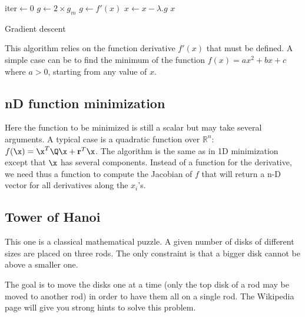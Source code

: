 \documentclass{ecnreport}
\begin{document}
\begin{algorithm}[!h]
{}
iter$\gets$0\;
$g\gets2\times g_m$\;
{
$g\gets f'(x)$\;
$x\gets x - \lambda.g$\;
}
\Return $x$\;
\caption{Gradient descent}
\label{algo:grad}
\end{algorithm}

This algorithm relies on the function derivative $f'(x)$ that must be defined. A simple case can be to find the minimum of the function $f(x) = ax^2+bx+c$ where $a>0$, starting from any value of $x$.

\begin{itemize}
 \end{itemize}
 
\subsection{nD function minimization}

Here the function to be minimized is still a scalar but may take several arguments. A typical case is a quadratic function over $\mathbb{R}^n$: $f(\x) = \x^T\Q\x + \mathbf{r}^T\x$. The algorithm is the same as in 1D minimization except that $\x$ has several components. Instead of a function for the derivative, we need thus a function to compute the Jacobian of $f$ that will return a n-D vector for all derivatives along the $x_i$'s. 

\begin{itemize}
 \end{itemize}

 
\subsection{Tower of Hanoi}

This one is a classical mathematical puzzle.
A given number of disks of different sizes are placed on three rods.
The only constraint is that a bigger disk cannot be above a smaller one. 

The goal is to move the disks one at a time (only the top disk of a rod may be moved to another rod) in order to have them all on a single rod.
The Wikipedia page will give you strong hints to solve this problem.
\end{document}
